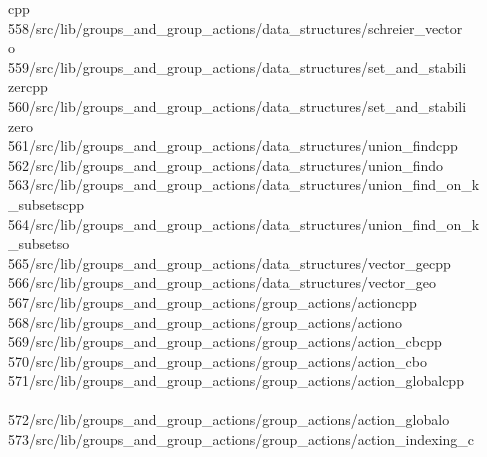 \begin{tabbing}
\>cpp\\[0pt]
558\>/src/lib/groups\_and\_group\_actions/data\_structures/schreier\_vector\\[0pt]
\>o\\[0pt]
559\>/src/lib/groups\_and\_group\_actions/data\_structures/set\_and\_stabili\\[0pt]
\>zercpp\\[0pt]
560\>/src/lib/groups\_and\_group\_actions/data\_structures/set\_and\_stabili\\[0pt]
\>zero\\[0pt]
561\>/src/lib/groups\_and\_group\_actions/data\_structures/union\_findcpp\\[0pt]
562\>/src/lib/groups\_and\_group\_actions/data\_structures/union\_findo\\[0pt]
563\>/src/lib/groups\_and\_group\_actions/data\_structures/union\_find\_on\_k\\[0pt]
\>\_subsetscpp\\[0pt]
564\>/src/lib/groups\_and\_group\_actions/data\_structures/union\_find\_on\_k\\[0pt]
\>\_subsetso\\[0pt]
565\>/src/lib/groups\_and\_group\_actions/data\_structures/vector\_gecpp\\[0pt]
566\>/src/lib/groups\_and\_group\_actions/data\_structures/vector\_geo\\[0pt]
567\>/src/lib/groups\_and\_group\_actions/group\_actions/actioncpp\\[0pt]
568\>/src/lib/groups\_and\_group\_actions/group\_actions/actiono\\[0pt]
569\>/src/lib/groups\_and\_group\_actions/group\_actions/action\_cbcpp\\[0pt]
570\>/src/lib/groups\_and\_group\_actions/group\_actions/action\_cbo\\[0pt]
571\>/src/lib/groups\_and\_group\_actions/group\_actions/action\_globalcpp\\[0pt]
\>\\[0pt]
572\>/src/lib/groups\_and\_group\_actions/group\_actions/action\_globalo\\[0pt]
573\>/src/lib/groups\_and\_group\_actions/group\_actions/action\_indexing\_c\\[0pt]

\end{tabbing}
